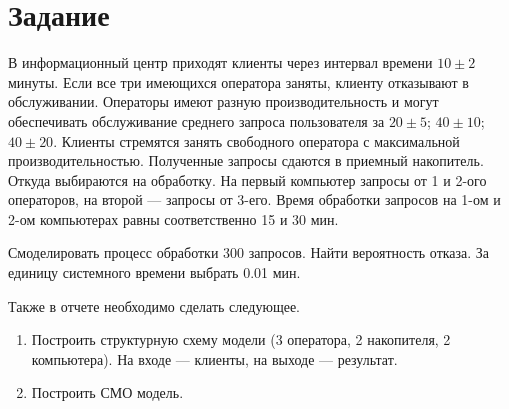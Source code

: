 \chapter{Задание}

В информационный центр приходят клиенты через интервал времени $10 \pm 2$
минуты. Если все три имеющихся оператора заняты, клиенту отказывают в
обслуживании. Операторы имеют разную производительность и могут
обеспечивать обслуживание среднего запроса пользователя за $20 \pm 5$; $40 \pm
10$; $40 \pm 20$. Клиенты стремятся занять свободного оператора с максимальной
производительностью. Полученные запросы сдаются в приемный накопитель. Откуда
выбираются на обработку. На первый компьютер запросы от 1 и 2-ого
операторов, на второй --- запросы от 3-его. Время обработки запросов на 1-ом
и 2-ом компьютерах равны соответственно 15 и 30 мин. 

Смоделировать процесс обработки 300 запросов. Найти вероятность отказа.
За единицу системного времени выбрать 0.01 мин. 

Также в отчете необходимо сделать следующее.
\begin{enumerate}
    \item Построить структурную схему модели (3 оператора, 2 накопителя, 2 компьютера). 
    На входе --- клиенты, на выходе --- результат.
    \item Построить СМО модель.
\end{enumerate}
